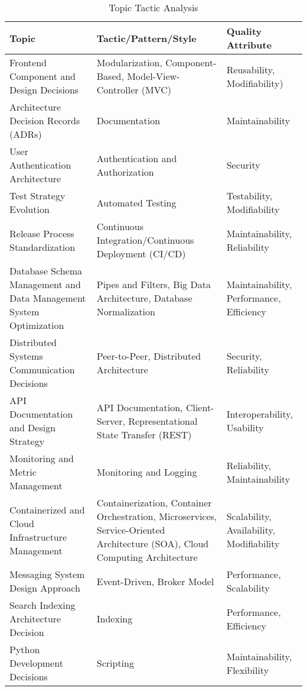 {\small
    \begin{longtable}{p{5cm}p{6cm}p{3cm}}
        \caption{Topic Tactic Analysis}
        \label{table:topic_tactic}
        \hline
        \textbf{Topic} & \textbf{Tactic/Pattern/Style} & \textbf{Quality Attribute} \\
        \hline
        \endhead %
        
        \hline
        \endfoot

        \endlastfoot
        
        Frontend Component and Design Decisions & Modularization, Component-Based, Model-View-Controller (MVC) & Reusability, Modifiability) \\
        Architecture Decision Records (ADRs) & Documentation & Maintainability \\
        User Authentication Architecture & Authentication and Authorization & Security \\
        Test Strategy Evolution & Automated Testing & Testability, Modifiability \\
        Release Process Standardization & Continuous Integration/Continuous Deployment (CI/CD) & Maintainability, Reliability \\
        Database Schema Management and Data Management System Optimization & Pipes and Filters, Big Data Architecture, Database Normalization & Maintainability, Performance, Efficiency \\
        Distributed Systems Communication Decisions & Peer-to-Peer, Distributed Architecture & Security, Reliability \\
        API Documentation and Design Strategy & API Documentation, Client-Server, Representational State Transfer (REST) & Interoperability, Usability \\
        Monitoring and Metric Management & Monitoring and Logging & Reliability, Maintainability \\
        Containerized and Cloud Infrastructure Management & Containerization, Container Orchestration, Microservices, Service-Oriented Architecture (SOA), Cloud Computing Architecture & Scalability, Availability, Modifiability \\
        Messaging System Design Approach & Event-Driven, Broker Model & Performance, Scalability \\
        Search Indexing Architecture Decision & Indexing & Performance, Efficiency \\
        Python Development Decisions & Scripting & Maintainability, Flexibility \\

\end{longtable}}
